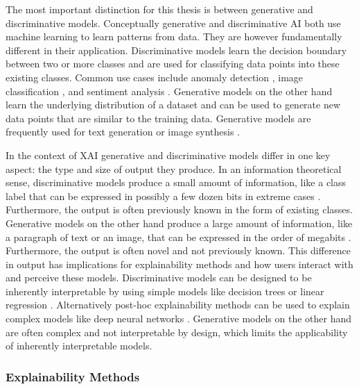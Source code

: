 The most important distinction for this thesis is between generative and discriminative models. Conceptually generative and discriminative \ac{AI} both use machine learning to learn patterns from data. They are however fundamentally different in their application. Discriminative models learn the decision boundary between two or more classes and are used for classifying data points into these existing classes. Common use cases include anomaly detection \parencite{Edozie2025, Hilal2022}, image classification \parencite{Lu2007}, and sentiment analysis \parencite{Wankhade2022}. Generative models on the other hand learn the underlying distribution of a dataset and can be used to generate new data points that are similar to the training data. Generative models are frequently used for text generation \parencite{Brown2020} or image synthesis \parencite{Rombach2021}.

In the context of \ac{XAI} generative and discriminative models differ in one key aspect: the type and size of output they produce. In an information theoretical sense, discriminative models produce a small amount of information, like a class label that can be expressed in possibly a few dozen bits in extreme cases \parencite{Schneider2024}. Furthermore, the output is often previously known in the form of existing classes. Generative models on the other hand produce a large amount of information, like a paragraph of text or an image, that can be expressed in the order of megabits \parencite{Schneider2024}. Furthermore, the output is often novel and not previously known. This difference in output has implications for explainability methods and how users interact with and perceive these models. Discriminative models can be designed to be inherently interpretable by using simple models like decision trees or linear regression \parencite{Rudin2019}. Alternatively post-hoc explainability methods can be used to explain complex models like deep neural networks \parencite{Ribeiro2016, Lundberg2017}. Generative models on the other hand are often complex and not interpretable by design, which limits the applicability of inherently interpretable models.

\subsubsection{Explainability Methods} \label{sssec:explainability_methods}

